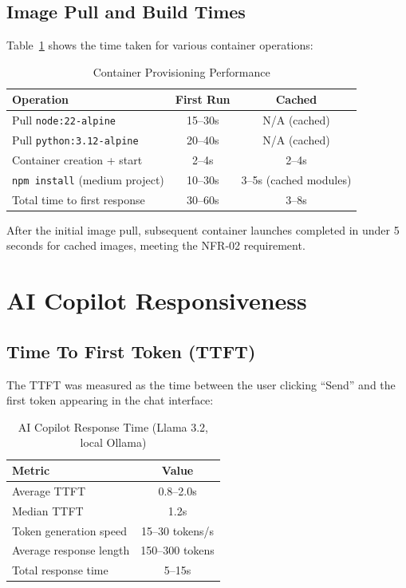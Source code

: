 \documentclass[12pt,a4paper,oneside]{report}
\begin{document}
\subsection{Image Pull and Build Times}

Table~\ref{tab:docker-results} shows the time taken for various container operations:

\begin{table}[H]
\centering
\caption{Container Provisioning Performance}
\label{tab:docker-results}
\begin{tabular}{lcc}
\toprule
\textbf{Operation} & \textbf{First Run} & \textbf{Cached} \\
\midrule
Pull \texttt{node:22-alpine} & 15--30s & N/A (cached) \\
Pull \texttt{python:3.12-alpine} & 20--40s & N/A (cached) \\
Container creation + start & 2--4s & 2--4s \\
\texttt{npm install} (medium project) & 10--30s & 3--5s (cached modules) \\
Total time to first response & 30--60s & 3--8s \\
\bottomrule
\end{tabular}
\end{table}

After the initial image pull, subsequent container launches completed in under 5 seconds for cached images, meeting the NFR-02 requirement.


\section{AI Copilot Responsiveness}

\subsection{Time To First Token (TTFT)}

The TTFT was measured as the time between the user clicking ``Send'' and the first token appearing in the chat interface:

\begin{table}[H]
\centering
\caption{AI Copilot Response Time (Llama 3.2, local Ollama)}
\label{tab:ai-results}
\begin{tabular}{lc}
\toprule
\textbf{Metric} & \textbf{Value} \\
\midrule
Average TTFT & 0.8--2.0s \\
Median TTFT & 1.2s \\
Token generation speed & 15--30 tokens/s \\
Average response length & 150--300 tokens \\
Total response time & 5--15s \\
\bottomrule
\end{tabular}
\end{table}
\end{document}

